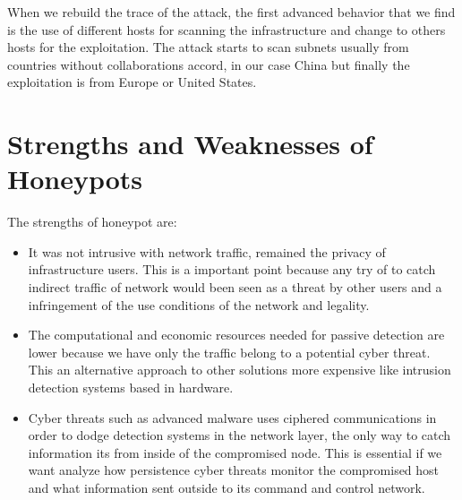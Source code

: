 \documentclass[a4paper]{llncs}
\begin{document}
When we rebuild the trace of the attack, the first advanced behavior that we find is the use of different hosts for scanning the infrastructure and change to others hosts for the exploitation. The attack starts to scan subnets usually from countries without collaborations accord, in our case China but finally the exploitation is from Europe or United States.
	
\section{Strengths and Weaknesses of Honeypots}
\label{sec:Strengths&Weaknesses}
The strengths of honeypot are:
\begin{itemize}
	\item It was not intrusive with network traffic, remained the privacy of infrastructure users. This is a important point because any try of to catch indirect traffic of network would been seen as a threat by other users and a infringement of the use conditions of the network and legality.
	\item The computational and economic resources needed for passive detection are lower because we have only the traffic belong to a potential cyber threat. This an alternative approach to other solutions more expensive like intrusion detection systems based in hardware.
	\item Cyber threats such as advanced malware uses ciphered communications in order to dodge detection systems in the network layer, the only way to catch information its from inside of the compromised node. This is essential if we want analyze how persistence cyber threats monitor the compromised host and what information sent outside to its command and control network.
\end{itemize}
	
\end{document}
